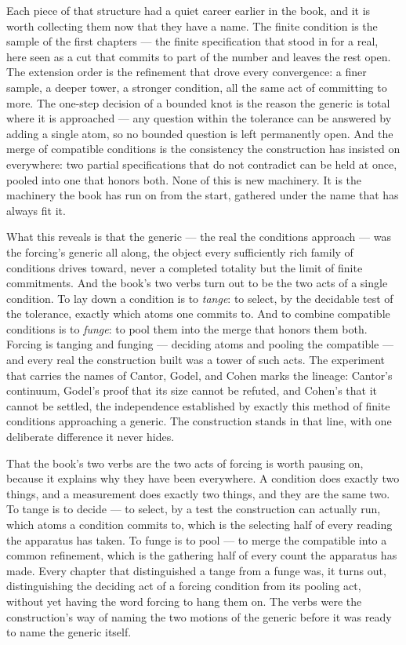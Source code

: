 Each piece of that structure had a quiet career earlier in the book, and it is worth collecting them now
that they have a name. The finite condition is the sample of the first chapters --- the finite
specification that stood in for a real, here seen as a cut that commits to part of the number and leaves
the rest open. The extension order is the refinement that drove every convergence: a finer sample, a
deeper tower, a stronger condition, all the same act of committing to more. The one-step decision of a
bounded knot is the reason the generic is total where it is approached --- any question within the
tolerance can be answered by adding a single atom, so no bounded question is left permanently open. And
the merge of compatible conditions is the consistency the construction has insisted on everywhere: two
partial specifications that do not contradict can be held at once, pooled into one that honors both. None
of this is new machinery. It is the machinery the book has run on from the start, gathered under the name
that has always fit it.

What this reveals is that the generic --- the real the conditions approach --- was the forcing's generic
all along, the object every sufficiently rich family of conditions drives toward, never a completed
totality but the limit of finite commitments. And the book's two verbs turn out to be the two acts of a
single condition. To lay down a condition is to \emph{tange}: to select, by the decidable test of the
tolerance, exactly which atoms one commits to. And to combine compatible conditions is to \emph{funge}:
to pool them into the merge that honors them both. Forcing is tanging and funging --- deciding atoms and
pooling the compatible --- and every real the construction built was a tower of such acts. The
experiment that carries the names of Cantor, Godel, and Cohen marks the lineage: Cantor's continuum,
Godel's proof that its size cannot be refuted, and Cohen's that it cannot be settled, the independence
established by exactly this method of finite conditions approaching a generic. The construction stands in
that line, with one deliberate difference it never hides.

That the book's two verbs are the two acts of forcing is worth pausing on, because it explains why they
have been everywhere. A condition does exactly two things, and a measurement does exactly two things, and
they are the same two. To tange is to decide --- to select, by a test the construction can actually run,
which atoms a condition commits to, which is the selecting half of every reading the apparatus has taken.
To funge is to pool --- to merge the compatible into a common refinement, which is the gathering half of
every count the apparatus has made. Every chapter that distinguished a tange from a funge was, it turns
out, distinguishing the deciding act of a forcing condition from its pooling act, without yet having the
word forcing to hang them on. The verbs were the construction's way of naming the two motions of the
generic before it was ready to name the generic itself.

